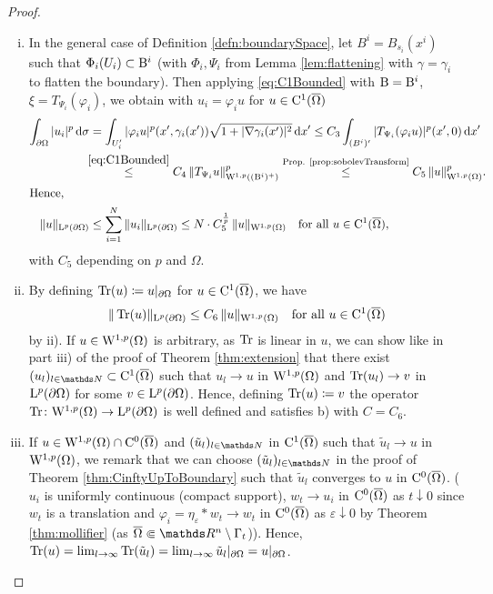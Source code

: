 \begin{proof}
\begin{enumerate}[i)]
  \item In the general case of Definition \ref{defn:boundarySpace}, let $B^i = B_{s_i}(x^i)$ such that $\Phi_i(U_i) \subset \mathrm{B}^i$ (with $\Phi_i, \Psi_i$ from Lemma \ref{lem:flattening} with $\gamma = \gamma_i$ to flatten the boundary).
    Then applying \eqref{eq:C1Bounded} with $\mathrm{B} = \mathrm{B}^i$, $\xi = T_{\Psi_i}(\varphi_i)$, we obtain with $u_i = \varphi_i u$ for $u \in \mathrm{C}^1(\overline\Omega)$
    \begin{align*}
      \int_{\partial\Omega} | u_i |^p \, {\operatorname{d}\!{\sigma}}
      &= \int_{U_i'} |\varphi_i u|^p (x', \gamma_i(x')) \sqrt{1 + |\nabla\gamma_i(x')|^2} \, {\operatorname{d}\!{x}}' 
      \leq C_3 \int_{(B^i)'} | T_{\Psi_i}(\varphi_i u) |^p (x', 0) \, {\operatorname{d}\!{x}}' \\
      &\hspace{-0.4em}\overset{\eqref{eq:C1Bounded}}{\leq} C_4 \, \|T_{\Psi_i} u\|^p_{\mathrm{W}^{1,p}((\mathrm{B}^i)^+)} 
      \overset{\text{Prop. \ref{prop:sobolevTransform}}}{\leq} C_5 \, \|u\|^p_{\mathrm{W}^{1,p}(\Omega)}. \\
    \intertext{Hence,}
      \|u\|_{\mathrm{L}^p(\partial\Omega)} &\leq \sum_{i = 1}^N \|u_i\|_{\mathrm{L}^p(\partial\Omega)} \leq N \cdot C_5^{\frac{1}{p}} \, \|u\|_{\mathrm{W}^{1,p}(\Omega)} \quad\text{for all } u \in \mathrm{C}^1(\overline\Omega),
    \end{align*}
    with $C_5$ depending on $p$ and $\Omega$.

  \item By defining $\operatorname{Tr}(u) \coloneqq u|_{\partial\Omega}$ for $u \in \mathrm{C}^1(\overline\Omega)$, we have
    $$
    \| \operatorname{Tr}(u)\|_{\mathrm{L}^p(\partial\Omega)} \leq C_6 \, \|u\|_{\mathrm{W}^{1,p}(\Omega)} \quad\text{for all } u \in \mathrm{C}^1(\overline\Omega)
    $$
    by ii).
    If $u \in \mathrm{W}^{1,p}(\Omega)$ is arbitrary, as $\operatorname{Tr}$ is linear in $u$, we can show like in part iii) of the proof of Theorem \ref{thm:extension} that there exist $(u_l)_{l \in \N} \subset \CC^{1}(\overline\Omega)$ such that $u_l \to u$ in $\mathrm{W}^{1,p}(\Omega)$ and $\operatorname{Tr}(u_l) \to v$ in $\mathrm{L}^p(\partial\Omega)$ for some $v \in \mathrm{L}^p(\partial\Omega)$.
    Hence, defining $\operatorname{Tr}(u) \coloneqq v$ the operator $\operatorname{Tr} \colon \mathrm{W}^{1,p}(\Omega) \to \mathrm{L}^p(\partial\Omega)$ is well defined and satisfies b) with $C = C_6$.

  \item If $u \in \mathrm{W}^{1,p}(\Omega) \cap \mathrm{C}^0(\overline\Omega)$ and $(\tilde u_l)_{l \in \N}$ in $\mathrm{C}^1(\overline\Omega)$ such that $\tilde u_l \to u$ in $\mathrm{W}^{1,p}(\Omega)$, we remark that we can choose $(\tilde u_l)_{l \in \N}$ in the proof of Theorem \ref{thm:CinftyUpToBoundary} such that $\tilde u_l$ converges to $u$ in $\mathrm{C}^0(\overline\Omega)$.
    ($u_i$ is uniformly continuous (compact support), $w_t \to u_i$ in $\mathrm{C}^0(\overline\Omega)$ as $t \downarrow 0$ since $w_t$ is a translation and $\varphi_i = \eta_\varepsilon \ast w_t \to w_t$ in $\mathrm{C}^0(\overline\Omega)$ as $\varepsilon \downarrow 0$  by Theorem \ref{thm:mollifier} (as $\overline\Omega \Subset \R^n \setminus \Gamma_t$)).
    Hence, $\operatorname{Tr} (u) = \lim_{l \to \infty} \operatorname{Tr} (\tilde u_l) = \lim_{l \to \infty} \tilde u_l|_{\partial\Omega} = u|_{\partial \Omega}$. \qedhere
\end{enumerate}
\end{proof}


